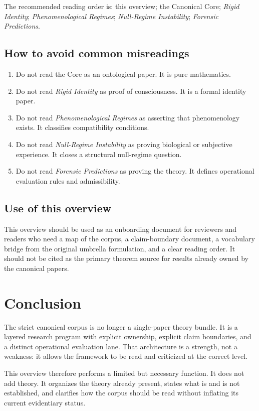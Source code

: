 \documentclass[11pt,a4paper]{article}
\begin{document}
The recommended reading order is: this overview; the Canonical Core; \textit{Rigid Identity}; \textit{Phenomenological Regimes}; \textit{Null-Regime Instability}; \textit{Forensic Predictions}.

\subsection{How to avoid common misreadings}

\begin{enumerate}[leftmargin=*]
\item Do not read the Core as an ontological paper. It is pure mathematics.
\item Do not read \textit{Rigid Identity} as proof of consciousness. It is a formal identity paper.
\item Do not read \textit{Phenomenological Regimes} as asserting that phenomenology exists. It classifies compatibility conditions.
\item Do not read \textit{Null-Regime Instability} as proving biological or subjective experience. It closes a structural null-regime question.
\item Do not read \textit{Forensic Predictions} as proving the theory. It defines operational evaluation rules and admissibility.
\end{enumerate}

\subsection{Use of this overview}

This overview should be used as an onboarding document for reviewers and readers who need a map of the corpus, a claim-boundary document, a vocabulary bridge from the original umbrella formulation, and a clear reading order. It should not be cited as the primary theorem source for results already owned by the canonical papers.

\section{Conclusion}

The strict canonical corpus is no longer a single-paper theory bundle. It is a layered research program with explicit ownership, explicit claim boundaries, and a distinct operational evaluation lane. That architecture is a strength, not a weakness: it allows the framework to be read and criticized at the correct level.

This overview therefore performs a limited but necessary function. It does not add theory. It organizes the theory already present, states what is and is not established, and clarifies how the corpus should be read without inflating its current evidentiary status.

\printbibliography
\end{document}
